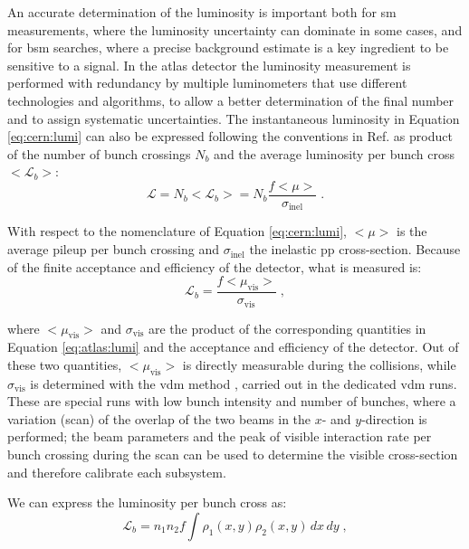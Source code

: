 An accurate determination of the luminosity is important both for \gls{sm} measurements, where the luminosity uncertainty can dominate in some cases, and for \gls{bsm} searches, where a precise background estimate is a key ingredient to be sensitive to a signal. In the \gls{atlas} detector the luminosity measurement is performed with redundancy by multiple luminometers that use different technologies and algorithms, to allow a better determination of the final number and to assign systematic uncertainties. The instantaneous luminosity in Equation \ref{eq:cern:lumi} can also be expressed following the conventions in Ref. \cite{Aaboud:2016hhf} as product of the number of bunch crossings $N_b$ and the average luminosity per bunch cross ${<}\mathcal{L}_b{>}$:
\begin{equation}
\mathcal{L} = N_b {<}\mathcal{L}_b{>} = N_b \frac{f {<}\mu{>}}{\sigma_{\mathrm{inel}} } \; .
\label{eq:atlas:lumi}
\end{equation}

With respect to the nomenclature of Equation \ref{eq:cern:lumi}, ${<}\mu{>}$ is the average pileup per bunch crossing and $\sigma_{\mathrm{inel}}$ the inelastic \gls{pp} cross-section. Because of the finite acceptance and efficiency of the detector, what is measured is:
\begin{equation}
\mathcal{L}_b = \frac{f {<}\mu_\mathrm{vis}{>}}{\sigma_{\mathrm{vis}} } \; , \nonumber
\end{equation}

\noindent where ${<}\mu_\mathrm{vis}{>}$ and $\sigma_{\mathrm{vis}}$ are the product of the corresponding quantities in Equation \ref{eq:atlas:lumi} and the acceptance and efficiency of the detector. Out of these two quantities, ${<}\mu_\mathrm{vis}{>}$ is directly measurable during the collisions, while $\sigma_{\mathrm{vis}}$ is determined with the \gls{vdm} method \cite{vanderMeer:296752}, carried out in the dedicated \gls{vdm} runs. These are special runs with low bunch intensity and number of bunches, where a variation (scan) of the overlap of the two beams in the $x$- and $y$-direction is performed; the beam parameters and the peak of visible interaction rate per bunch crossing during the scan can be used to determine the visible cross-section and therefore calibrate each subsystem. 

We can express the luminosity per bunch cross as:
\begin{equation}
\mathcal{L}_b = n_1 n_2 f \int \rho_1(x,y) \rho_2(x,y) \, dx \, dy \; ,
\label{eq:lumi_vdm1}
\end{equation}


